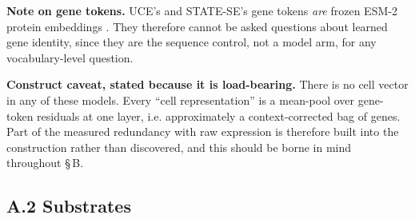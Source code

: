 \textbf{Note on gene tokens.} UCE's and STATE-SE's gene tokens \emph{are} frozen ESM-2 protein embeddings \citep{lin2023esm2}. They
therefore cannot be asked questions about learned gene identity, since they are the sequence control, not a
model arm, for any vocabulary-level question.

\textbf{Construct caveat, stated because it is load-bearing.} There is no cell vector in any of these
models. Every ``cell representation'' is a mean-pool over gene-token residuals at one layer, i.e.
approximately a context-corrected bag of genes. Part of the measured redundancy with raw expression is
therefore built into the construction rather than discovered, and this should be borne in mind
throughout \S\,B.

\hypertarget{a.2-substrates}{%
\subsection{A.2 Substrates}\label{a.2-substrates}}

